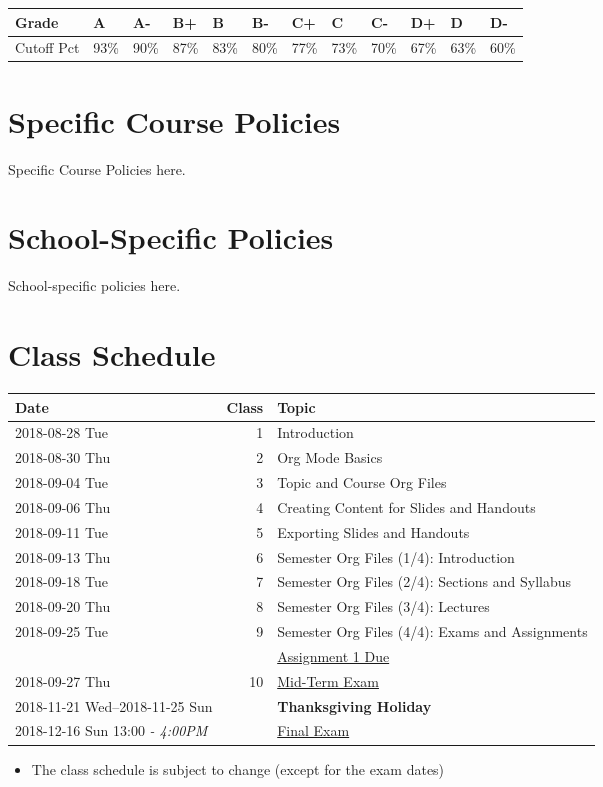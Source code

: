 \documentclass[article,letterpaper,times,10pt,listings-bw,microtype]{scrartcl}
\begin{document}
\begin{center}
\begin{tabular}{llllllllllll}
\hline
Grade & A & A- & B+ & B & B- & C+ & C & C- & D+ & D & D-\\
\hline
Cutoff Pct & 93\% & 90\% & 87\% & 83\% & 80\% & 77\% & 73\% & 70\% & 67\% & 63\% & 60\%\\
\hline
\end{tabular}
\end{center}
\section*{Specific Course Policies}
\label{sec:org1c27214}
Specific Course Policies here.
\section*{School-Specific Policies}
\label{sec:org2db6eed}
School-specific policies here.
\clearpage
\section*{Class Schedule}
\label{sec:org6c33d23}
\begin{center}
\begin{tabular}{lrl}
Date & Class & Topic\\
\hline
2018-08-28 Tue & 1 & Introduction\\
2018-08-30 Thu & 2 & Org Mode Basics\\
2018-09-04 Tue & 3 & Topic and Course Org Files\\
2018-09-06 Thu & 4 & Creating Content for Slides and Handouts\\
2018-09-11 Tue & 5 & Exporting Slides and Handouts\\
2018-09-13 Thu & 6 & Semester Org Files (1/4): Introduction\\
2018-09-18 Tue & 7 & Semester Org Files (2/4): Sections and Syllabus\\
2018-09-20 Thu & 8 & Semester Org Files (3/4): Lectures\\
2018-09-25 Tue & 9 & Semester Org Files (4/4): Exams and Assignments\\
 &  & \uline{Assignment 1 Due}\\
2018-09-27 Thu & 10 & \uline{Mid-Term Exam}\\
2018-11-21 Wed--2018-11-25 Sun &  & \textbf{Thanksgiving Holiday}\\
2018-12-16 Sun 13:00  \emph{- 4:00PM} &  & \uline{Final Exam}\\
\end{tabular}
\end{center}

\begin{mdframed}[style=exampledefault, frametitle={Disclaimer}]
\begin{itemize}
\item The class schedule is subject to change (except for the exam dates)
\end{itemize}
\end{mdframed}
\end{document}
